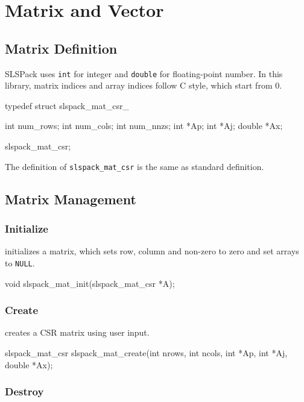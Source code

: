 
\chapter{Matrix and Vector}

\section{Matrix Definition}

SLSPack uses \verb|int| for integer and \verb|double| for floating-point number.
In this library, matrix indices and array indices follow C style, which start from 0.

\begin{evb}
typedef struct slspack_mat_csr_
{
    int num_rows;
    int num_cols;
    int num_nnzs;
    int *Ap;
    int *Aj;
    double *Ax;

} slspack_mat_csr;
\end{evb}

The definition of \verb|slspack_mat_csr| is the same as standard definition.

\section{Matrix Management}

\subsection{Initialize}

 initializes a matrix, which sets row, column and non-zero to zero and 
set arrays to \verb|NULL|.

\begin{evb}
void slspack_mat_init(slspack_mat_csr *A);
\end{evb}

\subsection{Create}
 creates a CSR matrix using user input.
\begin{evb}
slspack_mat_csr slspack_mat_create(int nrows, int ncols, int *Ap, int *Aj, double *Ax);
\end{evb}

\subsection{Destroy}


